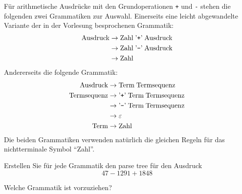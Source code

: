 Für arithmetische Ausdrücke mit den Grundoperationen
{\tt +} und {\tt -} stehen die folgenden zwei Grammatiken
zur Auswahl. Einerseits eine leicht abgewandelte Variante
der in der Vorlesung besprochenen Grammatik:
\begin{align*}
\text{Ausdruck}&\rightarrow \text{Zahl}\;\text{'{\tt +}'}\;\text{Ausdruck} \\
               &\rightarrow \text{Zahl}\;\text{'{\tt -}'}\;\text{Ausdruck} \\
               &\rightarrow \text{Zahl}
\end{align*}
Andererseits die folgende Grammatik:
\begin{align*}
\text{Ausdruck}&\rightarrow \text{Term}\;\text{Termsequenz}\\
\text{Termsequenz}&\rightarrow \text{'{\tt +}'}\; \text{Term}\; \text{Termsequenz}\\
                  &\rightarrow \text{'{\tt -}'}\; \text{Term}\; \text{Termsequenz}\\
                  &\rightarrow \varepsilon\\
 \text{Term}&\rightarrow \text{Zahl}
\end{align*}
Die beiden Grammatiken verwenden natürlich die gleichen Regeln
für das nichtterminale Symbol ``Zahl''.
\begin{teilaufgaben}
\item Erstellen Sie für jede Grammatik den parse tree für den Ausdruck
\[
47-1291+1848
\]
\item Welche Grammatik ist vorzuziehen?
\end{teilaufgaben}


